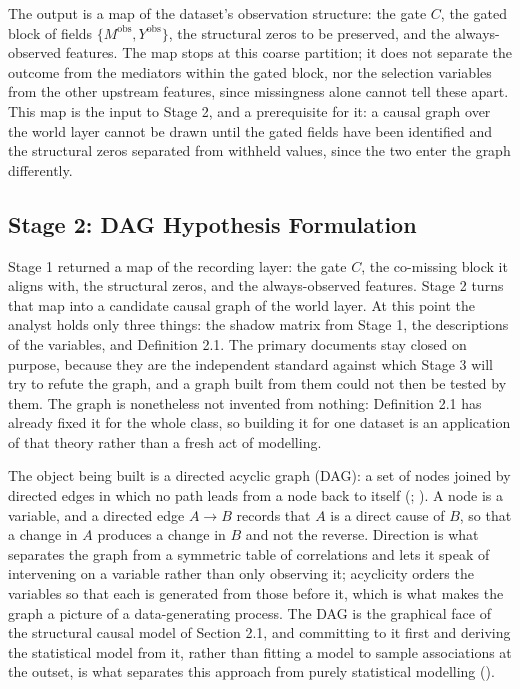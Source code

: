 The output is a map of the dataset's observation structure: the gate $C$, the gated block of fields $\{M^{\text{obs}}, Y^{\text{obs}}\}$, the structural zeros to be preserved, and the always-observed features. The map stops at this coarse partition; it does not separate the outcome from the mediators within the gated block, nor the selection variables from the other upstream features, since missingness alone cannot tell these apart. This map is the input to Stage 2, and a prerequisite for it: a causal graph over the world layer cannot be drawn until the gated fields have been identified and the structural zeros separated from withheld values, since the two enter the graph differently.

\subsection{Stage 2: DAG Hypothesis Formulation}

Stage 1 returned a map of the recording layer: the gate $C$, the co-missing block it aligns with, the structural zeros, and the always-observed features. Stage 2 turns that map into a candidate causal graph of the world layer. At this point the analyst holds only three things: the shadow matrix from Stage 1, the descriptions of the variables, and Definition 2.1. The primary documents stay closed on purpose, because they are the independent standard against which Stage 3 will try to refute the graph, and a graph built from them could not then be tested by them. The graph is nonetheless not invented from nothing: Definition 2.1 has already fixed it for the whole class, so building it for one dataset is an application of that theory rather than a fresh act of modelling.

The object being built is a directed acyclic graph (DAG): a set of nodes joined by directed edges in which no path leads from a node back to itself (; ). A node is a variable, and a directed edge $A \to B$ records that $A$ is a direct cause of $B$, so that a change in $A$ produces a change in $B$ and not the reverse. Direction is what separates the graph from a symmetric table of correlations and lets it speak of intervening on a variable rather than only observing it; acyclicity orders the variables so that each is generated from those before it, which is what makes the graph a picture of a data-generating process. The DAG is the graphical face of the structural causal model of Section 2.1, and committing to it first and deriving the statistical model from it, rather than fitting a model to sample associations at the outset, is what separates this approach from purely statistical modelling ().


